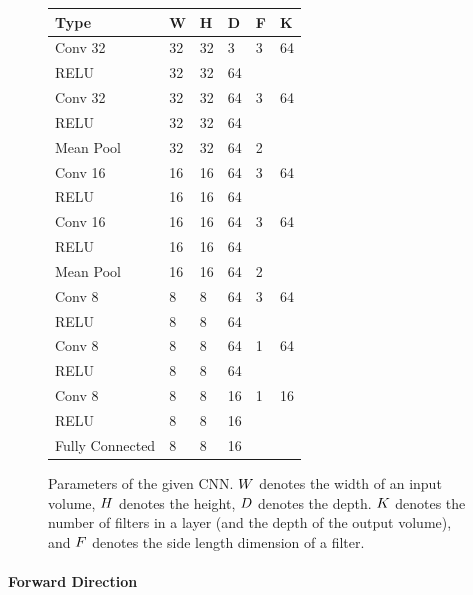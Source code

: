 \begin{figure}
\begin{tabular}{m{8em} | m{3em} m{3em} m{3em} m{3em} m{3em}}
Type 	& W	&	H	& D	&	F&	K  \\ \hline
Conv	32	&32	& 	32&	3	&	3&	64 \\
RELU	&32	&	32&	64\\		
Conv	32	&32	&	32	&	64&	3&	64\\
RELU	&32	&	32&	64\\		
Mean Pool&32&	32&	64&	2\\	
Conv	16	&16&	16&	64&	3&	64\\
RELU	&16&	16&	64\\		
Conv	16	&16	&	16&	64&	3&	64\\
RELU	&16&	16&	64\\		
Mean Pool	&16&	16&	64&	2\\	
Conv	8	&8	&8&	64&	3&	64\\
RELU	&8&	8&	64\\		
Conv	8	&8	&	8&	64&	1&	64\\
RELU	&8	&	8&	64\\		
Conv	8	&8	&	8&	16&	1&	16\\
RELU	&8&	8&	16\\		
Fully Connected	&8&	8&	16		
\end{tabular}
\caption{Parameters of the given CNN. $W$ denotes the width of an input volume, $H$ denotes the height, $D$ denotes the depth.
$K$ denotes the number of filters in a layer (and the depth of the output volume), and $F$ denotes the side length dimension of a filter.}
\label{fig:cnn-params}
\end{figure}

\paragraph{Forward Direction}


